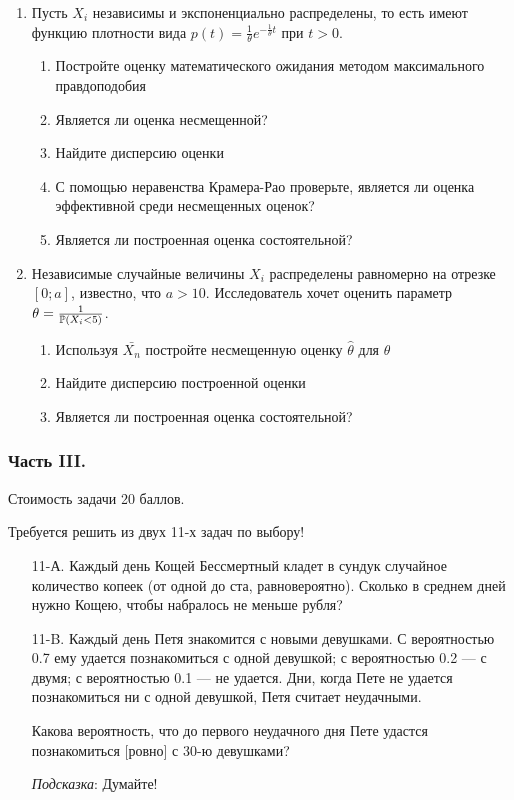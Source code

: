 \begin{enumerate}
\item Пусть $X_{i}$ независимы и экспоненциально
распределены, то есть имеют функцию плотности вида
$p(t)=\frac{1}{\theta}e^{-\frac{1}{\theta}t}$ при $t>0$.
\begin{enumerate}
\item Постройте оценку математического ожидания методом максимального
правдоподобия
\item Является ли оценка несмещенной?
\item Найдите дисперсию оценки
\item С помощью неравенства Крамера-Рао проверьте, является ли
оценка эффективной среди несмещенных оценок?
\item Является ли построенная оценка состоятельной?
\end{enumerate}


\item Независимые случайные величины $X_{i}$ распределены
равномерно на отрезке $[0;a]$, известно, что $a>10$. Исследователь
хочет оценить
параметр $\theta=\frac{1}{\P(X_{i}<5)}$.
\begin{enumerate}
\item Используя $\bar{X_{n}}$ постройте несмещенную оценку
$\hat{\theta}$ для $\theta$
\item Найдите дисперсию построенной оценки
\item Является ли построенная оценка состоятельной?
\end{enumerate}
\end{enumerate}

\subsubsection*{Часть III.}

Стоимость задачи 20 баллов.

Требуется решить \textbf{} из двух 11-х задач по
выбору!

\begin{enumerate}
\item[11-А.] Каждый день Кощей Бессмертный кладет в сундук случайное количество
копеек (от одной до ста, равновероятно). Сколько в среднем дней нужно Кощею, чтобы набралось не меньше рубля?

\item[11-B.] Каждый день Петя знакомится с новыми девушками. С вероятностью 0.7
ему удается познакомиться с одной девушкой; с вероятностью 0.2 — с
двумя; с вероятностью 0.1 — не удается. Дни, когда Пете не удается
познакомиться ни с одной девушкой, Петя считает неудачными.

Какова вероятность, что до первого неудачного дня Пете удастся
познакомиться $[$ровно$]$ с 30-ю девушками?

\emph{Подсказка}: Думайте!
\end{enumerate}

